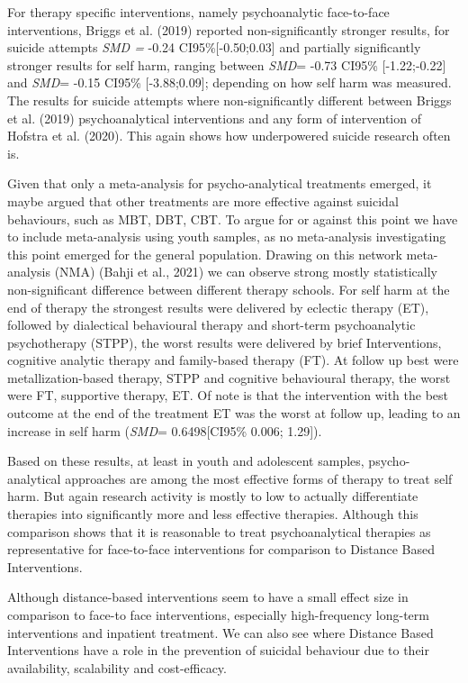 \documentclass[
  english,
  man]{apa6}
\begin{document}
For therapy specific interventions, namely psychoanalytic face-to-face interventions, Briggs et al. (2019) reported non-significantly stronger results, for suicide attempts \emph{SMD =} -0.24 CI95\%{[}-0.50;0.03{]} and partially significantly stronger results for self harm, ranging between \emph{SMD}= -0.73 CI95\% {[}-1.22;-0.22{]} and \emph{SMD}= -0.15 CI95\% {[}-3.88;0.09{]}; depending on how self harm was measured. The results for suicide attempts where non-significantly different between Briggs et al. (2019) psychoanalytical interventions and any form of intervention of Hofstra et al. (2020). This again shows how underpowered suicide research often is.

Given that only a meta-analysis for psycho-analytical treatments emerged, it maybe argued that other treatments are more effective against suicidal behaviours, such as MBT, DBT, CBT. To argue for or against this point we have to include meta-analysis using youth samples, as no meta-analysis investigating this point emerged for the general population. Drawing on this network meta-analysis (NMA) (Bahji et al., 2021) we can observe strong mostly statistically non-significant difference between different therapy schools. For self harm at the end of therapy the strongest results were delivered by eclectic therapy (ET), followed by dialectical behavioural therapy and short-term psychoanalytic psychotherapy (STPP), the worst results were delivered by brief Interventions, cognitive analytic therapy and family-based therapy (FT). At follow up best were metallization-based therapy, STPP and cognitive behavioural therapy, the worst were FT, supportive therapy, ET. Of note is that the intervention with the best outcome at the end of the treatment ET was the worst at follow up, leading to an increase in self harm (\emph{SMD}= 0.6498{[}CI95\% 0.006; 1.29{]}).

Based on these results, at least in youth and adolescent samples, psycho-analytical approaches are among the most effective forms of therapy to treat self harm. But again research activity is mostly to low to actually differentiate therapies into significantly more and less effective therapies. Although this comparison shows that it is reasonable to treat psychoanalytical therapies as representative for face-to-face interventions for comparison to Distance Based Interventions.

Although distance-based interventions seem to have a small effect size in comparison to face-to face interventions, especially high-frequency long-term interventions and inpatient treatment. We can also see where Distance Based Interventions have a role in the prevention of suicidal behaviour due to their availability, scalability and cost-efficacy.
\end{document}
